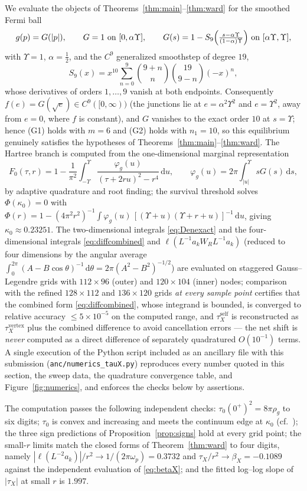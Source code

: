 \documentclass[11pt,a4paper]{amsart}
\theoremstyle{definition}
\theoremstyle{remark}
\newcommand{\dd}{\,\mathrm{d}}
\newcommand{\ellf}{\ell}
\begin{document}
We evaluate the objects of Theorems~\ref{thm:main}--\ref{thm:ward} for the smoothed Fermi ball
\[
g(p)=G(|p|),\qquad G=1\ \text{on }[0,\alpha\Upsilon],\qquad
G(s)=1-S_9\Bigl(\tfrac{s-\alpha\Upsilon}{(1-\alpha)\Upsilon}\Bigr)\ \text{on }[\alpha\Upsilon,\Upsilon],
\]
with $\Upsilon=1$, $\alpha=\tfrac12$, and the $C^9$ generalized smoothstep of degree $19$,
\[
S_9(x)=x^{10}\sum_{n=0}^{9}\binom{9+n}{n}\binom{19}{9-n}(-x)^n ,
\]
whose derivatives of orders $1,\dots,9$ vanish at both endpoints. Consequently $f(e)=G(\sqrt e)\in C^{9}([0,\infty))$ (the junctions lie at $e=\alpha^2\Upsilon^2$ and $e=\Upsilon^2$, away from $e=0$, where $f$ is constant), and $G$ vanishes to the exact order $10$ at $s=\Upsilon$; hence \textup{(G1)} holds with $m=6$ and \textup{(G2)} holds with $n_1=10$, so this equilibrium genuinely satisfies the hypotheses of Theorems~\ref{thm:main}--\ref{thm:ward}. The Hartree branch is computed from the one-dimensional marginal representation
\[
F_0(\tau,r)=1-\frac1{\pi^2}\int_{-\Upsilon}^{\Upsilon}\frac{\varphi_g(u)}{(\tau+2ru)^2-r^4}\dd u,
\qquad \varphi_g(u)=2\pi\int_{|u|}^{\Upsilon}sG(s)\dd s,
\]
by adaptive quadrature and root finding; the survival threshold solves $\Phi(\kappa_0)=0$ with
$\Phi(r)=1-(4\pi^2r^2)^{-1}\int\varphi_g(u)\,[(\Upsilon+u)(\Upsilon+r+u)]^{-1}\dd u$, giving $\kappa_0\approx0.23251$. The two-dimensional integrals \eqref{eq:Denexact} and the four-dimensional integrals \eqref{eq:diffcombined} and $\ellf(L^{-1}a_kW_RL^{-1}a_k)$ (reduced to four dimensions by the angular average $\int_0^{2\pi}(A-B\cos\theta)^{-1}\dd\theta=2\pi(A^2-B^2)^{-1/2}$) are evaluated on staggered Gauss--Legendre grids with $112\times96$ (outer) and $120\times104$ (inner) nodes; comparison with the refined $128\times112$ and $136\times120$ grids \emph{at every sample point} certifies that the combined form \eqref{eq:diffcombined}, whose integrand is bounded, is converged to relative accuracy $\le5\times10^{-5}$ on the computed range, and $\tau_X^{\mathrm{self}}$ is reconstructed as $\tau_X^{\mathrm{vertex}}$ plus the combined difference to avoid cancellation errors --- the net shift is \emph{never} computed as a direct difference of separately quadratured $O(10^{-1})$ terms. A single execution of the Python script included as an ancillary file with this submission (\texttt{anc/numerics\_tauX.py}) reproduces every number quoted in this section, the sweep data, the quadrature convergence table, and Figure~\ref{fig:numerics}, and enforces the checks below by assertions.

The computation passes the following independent checks: $\tau_0(0^+)^2=8\pi\rho_g$ to six digits; $\tau_0$ is convex and increasing and meets the continuum edge at $\kappa_0$ (cf.\ \cite[Theorem~2.6]{NY1}); the three sign predictions of Proposition~\ref{prop:signs} hold at every grid point; the small-$r$ limits match the closed forms of Theorem~\ref{thm:ward} to four digits, namely $|\ellf(L^{-2}a_k)|/r^2\to1/(2\pi\omega_p)=0.3732$ and $\tau_X/r^2\to\beta_X=-0.1089$ against the independent evaluation of \eqref{eq:betaX}; and the fitted log--log slope of $|\tau_X|$ at small $r$ is $1.997$.
\end{document}
